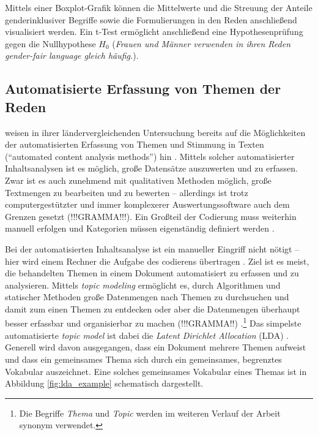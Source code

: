 \documentclass[12pt, 
    twoside=false, 
    bibliography=totoc, 
    numbers=endperiod, 
    headings=normal, 
    toc=chapterentrydotfill
    ]{scrbook}
\begin{document}
Mittels einer Boxplot-Grafik können die Mittelwerte und die Streuung der Anteile genderinklusiver Begriffe sowie die Formulierungen in den Reden anschließend visualisiert werden. Ein t-Test \parencite[vgl.][164ff.]{diaz-bone_2018} ermöglicht anschließend eine Hypothesenprüfung gegen die Nullhypothese $H_0$ (\emph{Frauen und Männer verwenden in ihren Reden gender-fair language gleich häufig.}).

\subsection{Automatisierte Erfassung von Themen der Reden}

\citeauthor{back_2018} weisen in ihrer ländervergleichenden Untersuchung bereits auf die Möglichkeiten der automatisierten Erfassung von Themen und Stimmung in Texten (\enquote{automated
content analysis methods}) hin \parencite*[18]{back_2018}. Mittels solcher automatisierter Inhaltsanalysen ist es möglich, große Datensätze auszuwerten und zu erfassen. Zwar ist es auch zunehmend mit qualitativen Methoden möglich, große Textmengen zu bearbeiten und zu bewerten \parencite[vgl.][]{raediker_2019} -- allerdings ist trotz computergestützter und immer komplexerer Auswertungssoftware auch dem Grenzen gesetzt (!!!GRAMMA!!!). Ein Großteil der Codierung muss weiterhin manuell erfolgen und Kategorien müssen eigenständig definiert werden \parencite[52f.]{raediker_2019}. 

Bei der automatisierten Inhaltsanalyse ist ein manueller Eingriff nicht nötigt -- hier wird einem Rechner die Aufgabe des codierens übertragen \parencite[161]{brosius_2012}. Ziel ist es meist, die behandelten Themen in einem Dokument automatisiert zu erfassen \parencite[36f.]{niekler_2018}  und zu analysieren. Mittels \emph{topic modeling} ermöglicht es, durch Algorithmen und statischer Methoden große Datenmengen nach Themen zu durchsuchen und damit zum einen Themen zu entdecken oder aber die Datenmengen überhaupt besser erfassbar und organisierbar zu machen (!!!GRAMMA!!) \parencites[vgl.][77ff.]{blei_2012}[vgl.][163]{brosius_2012}.\footnote{Die Begriffe \emph{Thema} und \emph{Topic} werden im weiteren Verlauf der Arbeit synonym verwendet.} Das simpelste automatisierte \emph{topic model} ist dabei die \emph{Latent Dirichlet Allocation} (LDA) \parencite[78]{blei_2012}. Generell wird davon ausgegangen, dass ein Dokument mehrere Themen aufweist \parencites[78]{blei_2012}[88]{niekler_2018} und dass ein gemeinsames Thema sich durch ein gemeinsames, begrenztes Vokabular auszeichnet.
Eine solches gemeinsames Vokabular eines Themas ist in Abbildung \ref{fig:lda_example} schematisch dargestellt.
\end{document}
